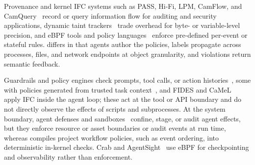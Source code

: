 Provenance and kernel IFC systems such as PASS, Hi-Fi, LPM, CamFlow, and CamQuery~\cite{muniswamy2006pass,pohly2012hifi,bates2015lpm,pasquier2017capture,pasquier2018camquery} record or query information flow for auditing and security applications, dynamic taint trackers~\cite{enck2010taintdroid,clause2007dytan,kemerlis2012libdft,yin2007panorama} trade overhead for byte- or variable-level precision, and eBPF tools and policy languages~\cite{ciliumtetragon,aquasecuritytracee,ghimire2025ebpfpatrol,galletta2026bpfence} enforce pre-defined per-event or stateful rules.
\sys{} differs in that agents author the policies, labels propagate across processes, files, and network endpoints at object granularity, and violations return semantic feedback.

Guardrails and policy engines check prompts, tool calls, or action histories~\cite{rebedea2023nemo,xiang2025guardagent,wang2025agentspec,kamath2025agentc,palumbo2026forge}, some with policies generated from trusted task context~\cite{tsai2025conseca}, and FIDES and CaMeL~\cite{costa2025fides,debenedetti2025camel} apply IFC inside the agent loop; these act at the tool or API boundary and do not directly observe the effects of scripts and subprocesses.
At the system boundary, agent defenses and sandboxes~\cite{hu2025agentsentinel,buhler2026agentbound,nvidia2026openshell,nvidia2026policyadvisor,cui2026contractwarden,hempel2026kairos,openai2025codex,anthropic2025srt} confine, stage, or audit agent effects, but they enforce resource or asset boundaries or audit events at run time, whereas \sys{} compiles project workflow policies, such as event ordering, into deterministic in-kernel checks.
Crab and AgentSight~\cite{wu2026crab,agentsight} use eBPF for checkpointing and observability rather than enforcement.

